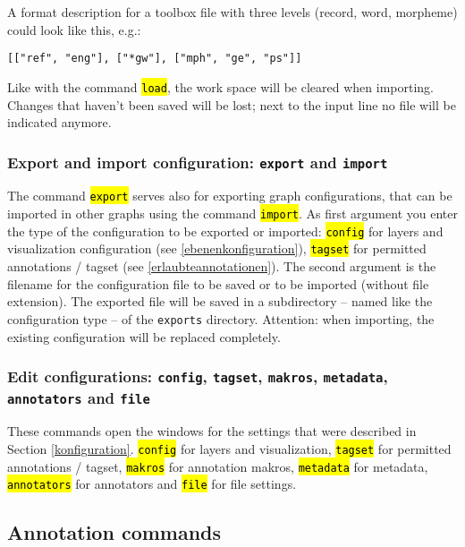 \documentclass[12pt]{scrartcl}
\newcommand{\code}[1]{\hl{\texttt{#1}}}
\begin{document}
A format description for a toolbox file with three levels (record, word, morpheme) could look like this, e.g.:

\begin{lstlisting}[gobble=4]
	[["ref", "eng"], ["*gw"], ["mph", "ge", "ps"]]
\end{lstlisting}

Like with the command \code{load}, the work space will be cleared when importing.
Changes that haven’t been saved will be lost; next to the input line no file will be indicated anymore.


\subsubsection{Export and import configuration: \texttt{export} and \texttt{import}}

The command \code{export} serves also for exporting graph configurations, that can be imported in other graphs using the command \code{import}.
As first argument you enter the type of the configuration to be exported or imported: \code{config} for layers and visualization configuration (see \ref{ebenenkonfiguration}), \code{tagset} for permitted annotations / tagset (see \ref{erlaubteannotationen}).
The second argument is the filename for the configuration file to be saved or to be imported (without file extension).
The exported file will be saved in a subdirectory – named like the configuration type – of the \texttt{exports} directory.
Attention: when importing, the existing configuration will be replaced completely.


\subsubsection{Edit configurations: \texttt{config}, \texttt{tagset}, \texttt{makros}, \texttt{metadata}, \texttt{annotators} and \texttt{file}}

These commands open the windows for the settings that were described in Section \ref{konfiguration}.
\code{config} for layers and visualization, \code{tagset} for permitted annotations / tagset, \code{makros} for annotation makros, \code{metadata} for metadata, \code{annotators} for annotators and \code{file} for file settings.


\subsection{Annotation commands}\label{annotationsbefehle}
\end{document}
